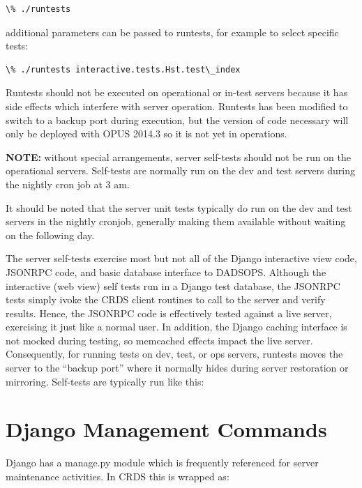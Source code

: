 \documentclass[letterpaper,10pt,english]{sphinxmanual}
\begin{document}
\begin{Verbatim}[commandchars=\\\{\}]
\% ./runtests
\end{Verbatim}

additional parameters can be passed to runtests,  for example to select specific tests:

\begin{Verbatim}[commandchars=\\\{\}]
\% ./runtests interactive.tests.Hst.test\_index
\end{Verbatim}

Runtests should not be executed on operational or in-test servers because it has side effects which interfere with
server operation.   Runtests has been modified to switch to a backup port during execution,  but the version of
code necessary will only be deployed with OPUS 2014.3 so it is not yet in operations.

\textbf{NOTE:}    without special arrangements,  server self-tests should not be run on the operational servers.
Self-tests are normally run on the dev and test servers during the nightly cron job at 3 am.

It should be noted that the server unit tests typically do run on the dev and test servers in the nightly
cronjob, generally making them available without waiting on the following day.

The server self-tests exercise most but not all of the Django interactive view code,  JSONRPC code, and basic database
interface to DADSOPS.   Although the interactive (web view) self tests run in a Django test database,  the JSONRPC
tests simply ivoke the CRDS client routines to call to the server and verify results.   Hence,  the JSONRPC code
is effectively tested against a live server,  exercising it just like a normal user.  In addition,  the Django
caching interface is not mocked during testing,  so memcached effects impact the live server.   Consequently,  for
running tests on dev, test, or ops servers,  runtests moves the server to the ``backup port'' where it normally hides
during server restoration or mirroring.   Self-tests are typically run like this:


\section{Django Management Commands}
\label{server_guide:django-management-commands}
Django has a manage.py module which is frequently referenced for server maintenance activities.   In CRDS this is
wrapped as:
\end{document}
